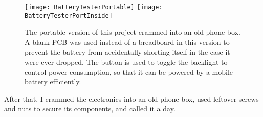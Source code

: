 \begin{figure}[h]
    \centering
    \texttt{[image: BatteryTesterPortable]}
    \texttt{[image: BatteryTesterPortInside]}
    \caption{
    The portable version of this project crammed into an old phone box. A blank PCB was used instead of a breadboard in this version to prevent the battery from accidentally shorting itself in the case it were ever dropped. The button is used to toggle the backlight to control power consumption, so that it can be powered by a mobile battery efficiently.
    }
\end{figure}

After that, I crammed the electronics into an old phone box, used leftover screws and nuts to secure its components, and called it a day.
